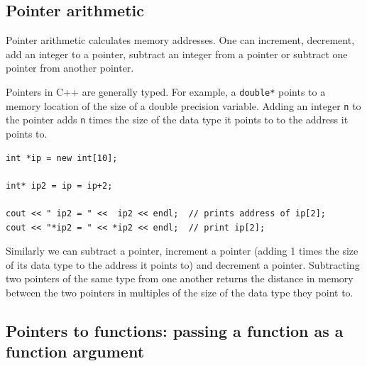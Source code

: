 
\subsection{Pointer arithmetic}

Pointer arithmetic calculates memory addresses. One can increment, decrement,
add an integer to a pointer, subtract an integer from a pointer or subtract
one pointer from another pointer.

Pointers in C++ are generally typed. For example, a \verb+double*+ points
to a memory location of the size of a double precision variable. Adding an
integer \verb+n+ to the pointer adds \verb+n+ times the size of the data
type it points to to the address it points to.
{\small \begin{verbatim}
int *ip = new int[10];

int* ip2 = ip = ip+2;

cout << " ip2 = " <<  ip2 << endl;  // prints address of ip[2];
cout << "*ip2 = " << *ip2 << endl;  // print ip[2];
\end{verbatim}}

Similarly we can subtract a pointer, increment a pointer (adding 1 times the
size of its data type to the address it points to) and decrement a pointer.
Subtracting two pointers of the same type from one another returns the distance
in memory between the two pointers in multiples of the size of the data type
they point to.


\subsection{Pointers to functions: passing a function as a function argument}


